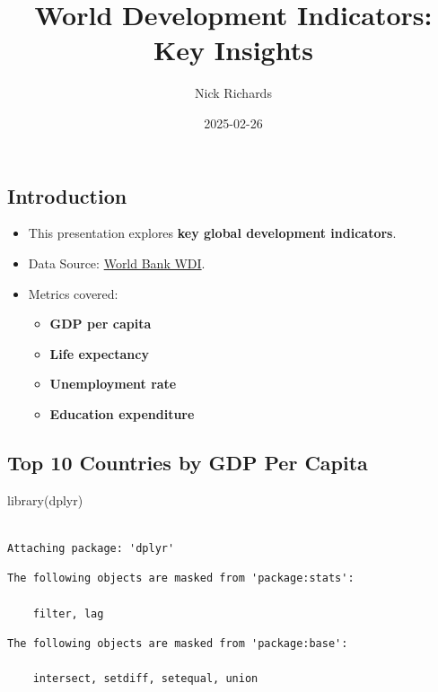\documentclass[
  letterpaper,
  DIV=11,
  numbers=noendperiod]{scrartcl}
\title{World Development Indicators: Key Insights}
\author{Nick Richards}
\date{2025-02-26}
\newenvironment{Shaded}{\begin{snugshade}}{\end{snugshade}}
\newcommand{\FunctionTok}[1]{\textcolor[rgb]{0.28,0.35,0.67}{#1}}
\newcommand{\NormalTok}[1]{\textcolor[rgb]{0.00,0.23,0.31}{#1}}
\providecommand{\tightlist}{%
  \setlength{\itemsep}{0pt}\setlength{\parskip}{0pt}}\usepackage{longtable,booktabs,array}
\begin{document}
\maketitle


\subsection{Introduction}\label{introduction}

\begin{itemize}
\tightlist
\item
  This presentation explores \textbf{key global development indicators}.
\item
  Data Source:
  \href{https://databank.worldbank.org/source/world-development-indicators}{World
  Bank WDI}.
\item
  Metrics covered:

  \begin{itemize}
  \tightlist
  \item
    \textbf{GDP per capita}
  \item
    \textbf{Life expectancy}
  \item
    \textbf{Unemployment rate}
  \item
    \textbf{Education expenditure}
  \end{itemize}
\end{itemize}

\subsection{Top 10 Countries by GDP Per
Capita}\label{top-10-countries-by-gdp-per-capita}

\begin{Shaded}
\begin{Highlighting}[]
\FunctionTok{library}\NormalTok{(dplyr)}
\end{Highlighting}
\end{Shaded}

\begin{verbatim}

Attaching package: 'dplyr'
\end{verbatim}

\begin{verbatim}
The following objects are masked from 'package:stats':

    filter, lag
\end{verbatim}

\begin{verbatim}
The following objects are masked from 'package:base':

    intersect, setdiff, setequal, union
\end{verbatim}
\end{document}
